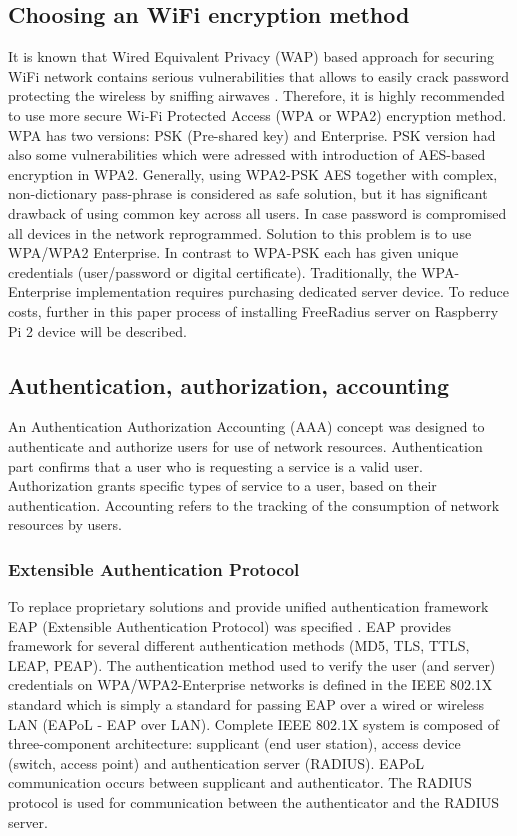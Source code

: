 \documentclass{llncs}
\begin{document}
\subsection{Choosing an WiFi encryption method}
It is known that Wired Equivalent Privacy (WAP) based approach for securing WiFi network contains serious vulnerabilities that allows to easily crack password protecting the wireless by sniffing airwaves
\cite{WebDeadAgain}. Therefore, it is highly recommended to use more secure Wi-Fi Protected Access (WPA or WPA2) encryption method. WPA has two versions: PSK (Pre-shared key) and Enterprise. PSK version had also some vulnerabilities \cite{WpaPskVulnerabilities} which were adressed with introduction of AES-based encryption in WPA2. Generally, using WPA2-PSK AES together with complex, non-dictionary pass-phrase is considered as safe solution, but it has significant drawback of using common key across all users.
In case password is compromised all devices in the network reprogrammed. Solution to this problem is to use WPA/WPA2 Enterprise. In contrast to WPA-PSK each has given unique credentials (user/password or digital certificate). Traditionally, the WPA-Enterprise implementation requires purchasing dedicated server device. To reduce costs, further in this paper process of installing FreeRadius server on Raspberry Pi 2 device will be described.

\subsection{Authentication, authorization, accounting}

An Authentication Authorization Accounting (AAA) \cite{rfc2903}\cite{rfc2904} concept was designed to authenticate and authorize users for use of network resources. Authentication part confirms that a user who is requesting a service is a valid user. Authorization grants specific types of service to a user, based on their authentication. Accounting refers to the tracking of the consumption of network resources by users.

\subsubsection{Extensible Authentication Protocol}

To replace proprietary solutions and provide unified authentication framework EAP (Extensible Authentication Protocol) was specified \cite{rfc3748}. EAP provides framework for several different authentication methods (MD5, TLS, TTLS, LEAP, PEAP). The authentication method used to verify the user (and server) credentials on WPA/WPA2-Enterprise networks is defined in the IEEE 802.1X standard which is simply a standard for passing EAP over a wired or wireless LAN (EAPoL - EAP over LAN). Complete IEEE 802.1X system is composed of three-component architecture: supplicant (end user station), access device (switch, access point) and authentication server (RADIUS).  EAPoL communication occurs between supplicant and authenticator. The RADIUS protocol is used for communication between the authenticator and the RADIUS server.
\end{document}
